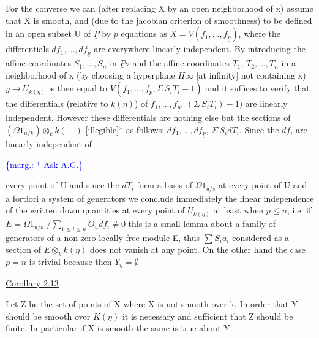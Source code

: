 \documentclass[11pt]{article}
\newcommand{\scanpage}[1]{\par\bigskip\noindent{\small\sffamily[scan #1]}\par}
\newcommand{\mspage}[1]{{\small\sffamily[p.\,#1]}}
\newcommand{\margin}[1]{\textcolor{blue}{\{\textsf{marg.:} #1\}}}
\newcommand{\uline}[1]{\underline{#1}}
\begin{document}
For the converse we can (after replacing X by an open
neighborhood of x) assume that X is smooth, and (due to the
jacobian criterion of smoothness) to be defined in an open subset
U of $\underline{P}$ by $\underline{p}$ equations as $X = V(f_1,\ldots,f_{\underline{p}})$, where the differentials
$df_1,\ldots,df_{\underline{p}}$ are everywhere linearly independent.  By introducing
the affine coordinates $S_1,\ldots,S_n$ in $\underline{P}$v and the affine coordinates
$T_1$, $T_2,\ldots,T_n$ in a neighborhood of x (by choosing a hyperplane $H\infty$
[at infinity] not containing x) $y \to U_{k(\eta)}$ is then equal to
$V(f_1,\ldots,f_{\underline{p}}, \Sigma\, S_iT_i - 1)$ and it suffices to verify that the
differentials (relative to $k(\eta)$) of $f_1,\ldots,f_{\underline{p}}$, $(\Sigma\, S_iT_i) - 1)$ are
linearly independent.  However these differentials are nothing
else but the sections of $(\Omega 1_{u/k}) \otimes_k k(\quad)$ [illegible]* as follows:
$df_1,\ldots,df_{\underline{p}}$, $\Sigma\, S_i dT_i$.  Since the $df_i$ are linearly independent of

\margin{* Ask A.G.}

\clearpage
\scanpage{24/16}
\mspage{16}

every point of U and since the $dT_i$ form a basis of $\Omega 1_{u/s}$ at every
point of U and a fortiori a system of generators we conclude
immediately the linear independence of the written down quantities
at every point of $U_{k(\eta)}$ at least when $p \leq n$, i.e.
if $E = \Omega 1_{u/k} \;/ \sum\limits_{1 \leq i \leq n} O_u df_i \neq 0$ this is a small lemma about a family of
generators of a non-zero locally free module E, thus $\sum S_i a_i$
considered as a section of $E \otimes_k k(\eta)$ does not vanish at any point.
On the other hand the case $p = n$ is trivial because then $Y_\eta = \emptyset$

\uline{Corollary 2.13}

Let Z be the set of points of X where X is not smooth over k.
In order that Y should be smooth over $K(\eta)$ it is necessary and
sufficient that Z should be finite. In particular if X is smooth
the same is true about Y.
\end{document}
